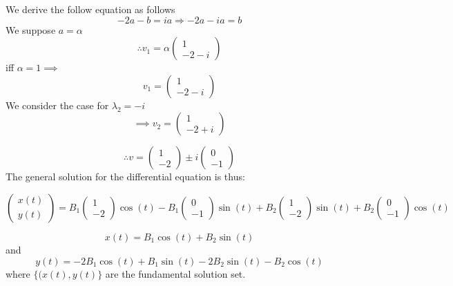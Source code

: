 \documentclass[12pt,a4paper]{article}
\begin{document}
\begin{enumerate}
    We derive the follow equation as follows
    \begin{equation*}
    -2a - b =ia \Rightarrow -2a-ia=b
    \end{equation*}
    We suppose  $a=\alpha $ 
    \[ 
     \therefore  v_1= \alpha \begin{pmatrix} 1 \\ -2-i \end{pmatrix}
    \]
    iff  $\alpha=1 \implies $
    \[ 
      v_1=  \begin{pmatrix} 1 \\ -2-i \end{pmatrix}
    \]
    We consider the case for  $\lambda_2 = -i $
    \[ 
     \implies  v_2=  \begin{pmatrix} 1 \\ -2+i \end{pmatrix}
    \]
     
    \[ 
      \therefore v =  \begin{pmatrix} 1 \\ -2 \end{pmatrix} \pm i \begin{pmatrix} 0 \\ -1 \end{pmatrix}
    \]
    The general solution for the differential equation is thus:

    \[ 
      \begin{pmatrix} x(t)\\ y(t) \end{pmatrix}
      = B_1\begin{pmatrix} 1 \\ -2    \end{pmatrix}\cos(t) -B_1 \begin{pmatrix} 0 \\ -1    \end{pmatrix}\sin(t) + B_2 \begin{pmatrix} 1 \\ -2    \end{pmatrix}\sin(t) +  B_2 \begin{pmatrix} 0 \\ -1    \end{pmatrix}\cos(t)
    \]
     
   \begin{equation*}
      x(t)= B_1 \cos(t) + B_2\sin(t)
   \end{equation*}
   and 
  \begin{equation*}
      y(t)= -2B_1 \cos(t) + B_1\sin(t) -2B_2\sin(t) - B_2\cos(t)
   \end{equation*} 
  where $\{ (x(t),  y(t)\}$ are the fundamental solution set.
  

\end{enumerate}
\end{document}
